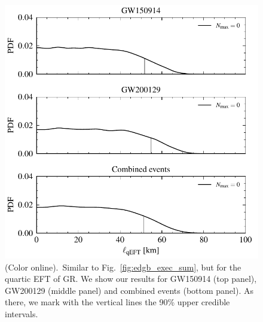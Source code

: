 \documentclass[twocolumn,
               prd,
               aps,
               superscriptaddress,
               tightenlines,
               nofootinbib,
               eqsecnum,
               amsfonts,
               amsmath,
               longbibliography]{revtex4-1}
\begin{document}
\begin{figure}[t]
\includegraphics[width=\columnwidth]{figs/qeft_posteriors_combined_corrected.pdf}
\caption{(Color online).~Similar to Fig.~\ref{fig:edgb_exec_sum}, but for the quartic EFT of GR.
We show our results for GW150914 (top panel), GW200129 (middle panel) and combined events (bottom panel).
%
As there, we mark with the vertical lines the 90\% upper credible intervals.
}
\label{fig:qEFT_exec_sum}
\end{figure}
\end{document}
